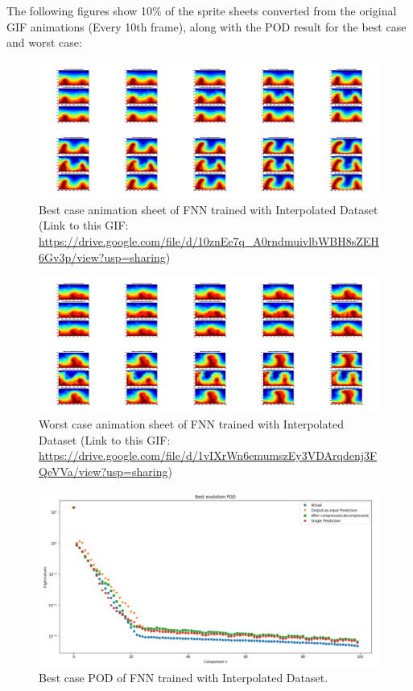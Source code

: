 The following figures show 10\% of the sprite sheets converted from the original GIF animations (Every 10th frame), along with the POD result for the best case and worst case:

\begin{figure}[H]
    \centering
    \caption{Best case animation sheet of FNN trained with Interpolated Dataset (Link to this GIF: \url{https://drive.google.com/file/d/10znEe7q_A0rndmuivlbWBH8sZEH6Gv3p/view?usp=sharing})}
    \includegraphics[scale=0.10]{figures/mantle_convection_images/larger_dataset_interpolated/FNN_Best_GIF_sheet.png}
\end{figure}

\begin{figure}[H]
    \centering
    \caption{Worst case animation sheet of FNN trained with Interpolated Dataset (Link to this GIF: 
    \url{https://drive.google.com/file/d/1vIXrWn6emumszEy3VDArqdenj3FQeVVa/view?usp=sharing})}
    \includegraphics[scale=0.10]{figures/mantle_convection_images/larger_dataset_interpolated/FNN_Worst_GIF_sheet.png}
\end{figure}


\begin{figure}[H]
    \caption{Best case POD of FNN trained with Interpolated Dataset.}
    \includegraphics[scale=0.5]{figures/mantle_convection_images/larger_dataset_interpolated/FNN_Best_POD.png}
\end{figure}

